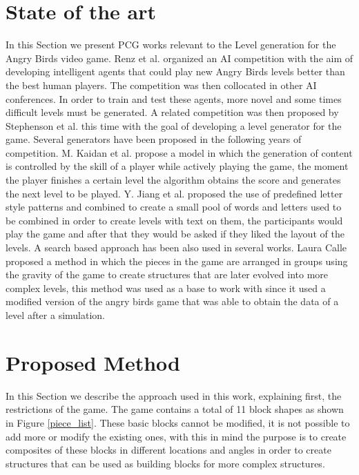 \documentclass[conference]{IEEEtran}
\begin{document}
    
    \section{State of the art}
    \label{SoA}
    In this Section we present PCG works relevant to the Level generation for the
    Angry Birds video game. Renz et al. \cite{Renz, Renz2015TheAB} organized an AI
    competition with the aim of developing intelligent agents that could play new
    Angry Birds levels better than the best human players. The competition was then
    collocated in other AI conferences. In order to train and test these agents,
    more novel and some times difficult levels must be generated. A related
    competition was then proposed by Stephenson et al. \cite{Stephenson} this time
    with the goal of developing a level generator for the game. Several generators
    have been proposed in the following years of competition. M. Kaidan et al.
    \cite{Kaidan2015} propose a model in which the generation of content is
    controlled by the skill of a player while actively playing the game, the moment
    the player finishes a certain level the algorithm obtains the score and
    generates the next level to be played. Y. Jiang et al. \cite{Jiang2017} proposed
    the use of predefined letter style patterns and combined to create a small pool
    of words and letters used to be combined in order to create levels with text on
    them, the participants would play the game and after that they would be asked if
    they liked the layout of the levels. A search based approach has been also used
    in several works. Laura Calle \cite{lauracalle} proposed a method in which the 
    pieces in the game are arranged in groups using the gravity of the game to 
    create structures that are later evolved into more complex levels, this method 
    was used as a base to work with since it used a modified version of the angry 
    birds game that was able to obtain the data of a level after a simulation.
    
    \section{Proposed Method}
    
    In this Section we describe the approach used in this work, explaining first,
    the restrictions of the game.
    The game contains a total of 11 block shapes as shown in Figure \ref{piece_list}.
    These basic blocks cannot be modified, it is not possible to add more or modify the existing ones,
    with this in mind the purpose is to create composites of these blocks in
    different locations and angles in order to create structures that can be used as
    building blocks for more complex structures. 
    
\end{document}
